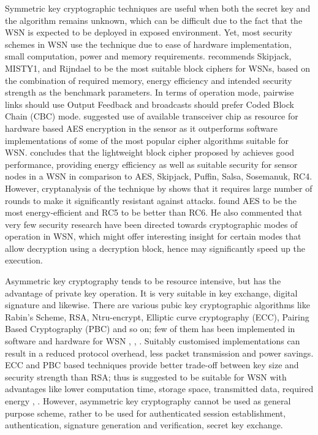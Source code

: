 \documentclass[conference,man]{IEEEtran}
\begin{document}
Symmetric key cryptographic techniques are useful when both the secret key and the algorithm remains unknown, which can be difficult due to the fact that the WSN is expected to be deployed in exposed environment. Yet, most security schemes in WSN use the technique due to ease of hardware implementation, small computation, power and memory requirements. 
\cite{ISI:000205012800003} recommends Skipjack, MISTY1, and Rijndael to be the most suitable block  ciphers for WSNs, based on the combination of required memory, energy efficiency and intended security strength as the benchmark parameters. In terms of operation mode, pairwise links should use Output Feedback and broadcasts should prefer Coded Block Chain (CBC) mode.
\cite{9783540795902} suggested use of available transceiver chip as resource for hardware based AES encryption in the sensor as it outperforms software implementations of some of the most popular cipher algorithms suitable for WSN.
\cite{5472979} concludes that the lightweight  block cipher proposed by \cite{youssef1996new} achieves good performance, providing  energy efficiency as well as suitable security for sensor nodes  in a WSN in comparison to AES, Skipjack, Puffin, Salsa, Sosemanuk, RC4. 
However, cryptanalysis of the technique by \cite{Heys:1996:CSP} shows that it requires large number of rounds to make it significantly resistant against attacks.
\cite{6216690} found AES to be the most energy-efficient and RC5 to be better than RC6. He also commented that very few security research have been directed towards cryptographic modes of operation in WSN, which might offer interesting insight for certain modes that allow decryption using a decryption block, hence may significantly speed up the execution.

Asymmetric key cryptography tends to be resource intensive, but has the advantage of private key operation.
It is very suitable in key exchange, digital signature and likewise. 
There are various pubic key cryptographic algorithms like Rabin's Scheme,  RSA, Ntru-encrypt, Elliptic curve cryptography (ECC), Pairing Based Cryptography (PBC) and so on; few of them has been implemented in software and hardware for WSN \cite{ISI:000290947700017}, \cite{ISI:000312683300029}, \cite{ISI:000328624800002}. %
Suitably customised implementations can result in a reduced protocol overhead, less packet transmission and power savings.
ECC and PBC based techniques provide better trade-off  between  key size and security strength than RSA; thus is suggested to be suitable for WSN with advantages like lower computation time, storage space, transmitted data, required energy \cite{Liu:2008:TCL:1371607.1372738}, \cite{Oliveira:2011:TPA:1930560.1931219}.%
However, asymmetric key cryptography  cannot be used as general purpose scheme, rather to be used for authenticated session establishment, authentication, signature generation and verification, secret key exchange.
\end{document}
